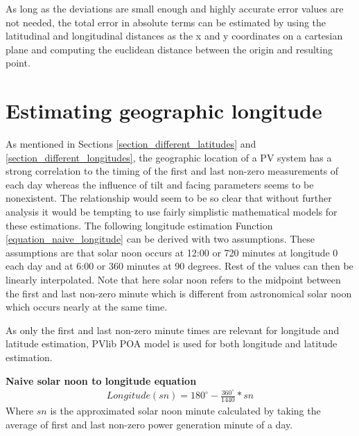 \noindent As long as the deviations are small enough and highly accurate error values are not needed, the total error in absolute terms can be estimated by using the latitudinal and longitudinal distances as the x and y coordinates on a cartesian plane and computing the euclidean distance between the origin and resulting point.


\newpage
\section{Estimating geographic longitude}
\noindent As mentioned in Sections \ref{section_different_latitudes} and \ref{section_different_longitudes}, the geographic location of a PV system has a strong correlation to the timing of the first and last non-zero measurements of each day whereas the influence of tilt and facing parameters seems to be nonexistent. The relationship would seem to be so clear that without further analysis it would be tempting to use fairly simplistic mathematical models for these estimations. The following longitude estimation Function \ref{equation_naive_longitude} can be derived with two assumptions. These assumptions are that solar noon occurs at 12:00 or 720 minutes at longitude 0 each day and at 6:00 or 360 minutes at 90 degrees. Rest of the values can then be linearly interpolated. Note that here solar noon refers to the midpoint between the first and last non-zero minute which is different from astronomical solar noon which occurs nearly at the same time.

As only the first and last non-zero minute times are relevant for longitude and latitude estimation, PVlib POA model is used for both longitude and latitude estimation.

\hfill \break






\noindent\textbf{Naive solar noon to longitude equation}
%
\begin{equation}
\begin{split}
\label{equation_naive_longitude}
Longitude(sn)=180^\circ-\frac{360^\circ}{1440}*sn
\end{split}
\end{equation}
Where $sn$ is the approximated solar noon minute calculated by taking the average of first and last non-zero power generation minute of a day. %

